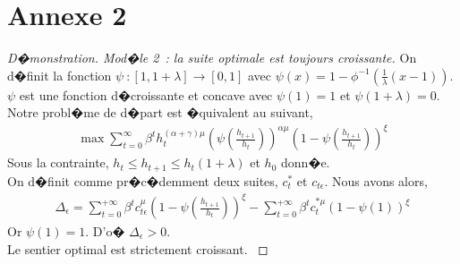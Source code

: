 \documentclass[10pt, hyperref={pdfpagemode=FullScreen}]{beamer} %
\begin{document}
\section{Annexe 2}

\begin{frame}\label{annexe2}
\begin{proof}[\scriptsize{D�monstration. Mod�le 2~: la suite optimale est toujours croissante}]
On d�finit la fonction $\psi~: [1,1+\lambda]\rightarrow [0,1]$ avec $\psi(x)=1-\phi^{-1}(\frac{1}{\lambda}(x-1))$. $\psi$ est une fonction d�croissante et concave avec $\psi(1)=1$ et $\psi(1+\lambda)=0$. Notre probl�me de d�part est �quivalent au suivant, 
\begin{eqnarray*}
\max\sum_{t=0}^{\infty}\beta^{t}h_{t}^{(\alpha+\gamma)\mu}\left(\psi(\frac{h_{t+1}}{h_{t}})\right)^{\alpha\mu}\left(1-\psi(\frac{h_{t+1}}{h_{t}})\right)^{\xi}
\end{eqnarray*} 
Sous la contrainte, $h_{t}\leq h_{t+1}\leq h_{t}(1+\lambda)$ et $h_{0}$ donn�e.\\
On d�finit comme pr�c�demment deux suites, $c_{t}^{*}$ et $c_{t\epsilon}$. Nous avons alors, 
\begin{eqnarray*}
\Delta_{\epsilon} = \sum_{t=0}^{+\infty}\beta^{t}c_{t\epsilon}^{\mu}\left(1-\psi(\frac{h_{t+1}}{h_{t}})\right)^{\xi} - \sum_{t=0}^{+\infty}\beta^{t}c_{t}^{*\mu}(1-\psi(1))^{\xi}
\end{eqnarray*}
Or $\psi(1)=1$. D'o� $\Delta_{\epsilon}>0$. \\
Le sentier optimal est strictement croissant. \hyperlink{proposition2}{}
\end{proof}
\end{frame}
\end{document}
